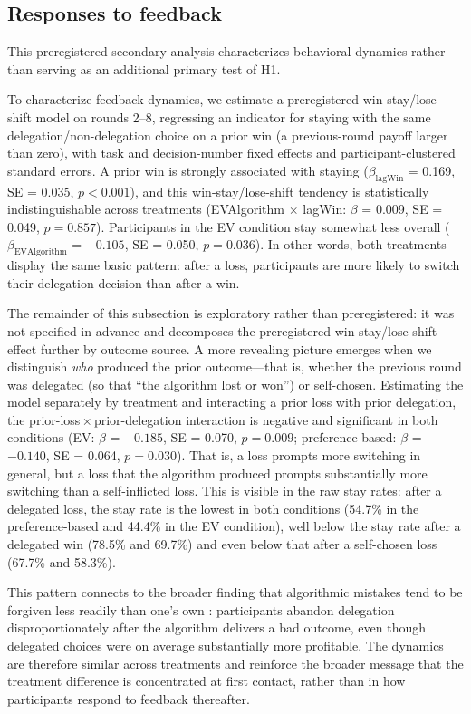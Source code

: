 \documentclass[a4paper, 12pt, fleqn]{article}
\theoremstyle{definition}
\newcommand{\inew}[1]{{\color{blue} #1\color{black}}}
\begin{document}
\subsection{Responses to feedback}
This preregistered secondary analysis characterizes behavioral dynamics rather than serving as an additional primary test of H1.

To characterize feedback dynamics, we estimate a preregistered win-stay/lose-shift model on rounds 2--8, regressing an indicator for staying with the same delegation/non-delegation choice on a prior win (a previous-round payoff larger than zero), with task and decision-number fixed effects and participant-clustered standard errors. A prior win is strongly associated with staying ($\beta_{\text{lagWin}}$ = 0.169, SE = 0.035, $p < 0.001$), and this win-stay/lose-shift tendency is statistically indistinguishable across treatments (EVAlgorithm $\times$ lagWin: $\beta$ = 0.009, SE = 0.049, $p = 0.857$). Participants in the EV condition stay somewhat less overall ($\beta_{\text{EVAlgorithm}}$ = $-0.105$, SE = 0.050, $p = 0.036$). In other words, both treatments display the same basic pattern: after a loss, participants are more likely to switch their delegation decision than after a win.

\inew{The remainder of this subsection is exploratory rather than preregistered: it was not specified in advance and decomposes the preregistered win-stay/lose-shift effect further by outcome source.} A more revealing picture emerges when we distinguish \emph{who} produced the prior outcome---that is, whether the previous round was delegated (so that ``the algorithm lost or won'') or self-chosen. Estimating the model separately by treatment and interacting a prior loss with prior delegation, the prior-loss\,$\times$\,prior-delegation interaction is negative and significant in both conditions (EV: $\beta$ = $-0.185$, SE = 0.070, $p = 0.009$; preference-based: $\beta$ = $-0.140$, SE = 0.064, $p = 0.030$). That is, a loss prompts more switching in general, but a loss that the algorithm produced prompts substantially more switching than a self-inflicted loss. This is visible in the raw stay rates: after a delegated loss, the stay rate is the lowest in both conditions (54.7\% in the preference-based and 44.4\% in the EV condition), well below the stay rate after a delegated win (78.5\% and 69.7\%) and even below that after a self-chosen loss (67.7\% and 58.3\%). 

This pattern connects to the broader finding that algorithmic mistakes tend to be forgiven less readily than one's own \citep{Dietvorst2018,Renier2021}: participants abandon delegation disproportionately after the algorithm delivers a bad outcome, even though delegated choices were on average substantially more profitable. The dynamics are therefore similar across treatments and reinforce the broader message that the treatment difference is concentrated at first contact, rather than in how participants respond to feedback thereafter.
\end{document}
